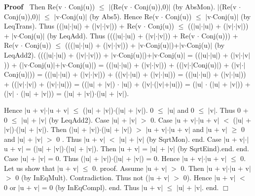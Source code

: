 \documentclass{article}
\newenvironment{forthel}{\begin{leftbar}}{\end{leftbar}}
\newenvironment{proof}{\noindent\textbf{Proof\ }}{\hspace*{\fill}$\Box$\medskip}
\newcommand{\cmul}{\cdot}
\newcommand{\cadd}{+}
\begin{document}
\begin{forthel}
\begin{proof}
Then Re(v $\cmul$ Conj(u)) $\leq$ $|$(Re(v $\cmul$ Conj(u)),0)$|$ (by AbsMon). $|$(Re(v $\cmul$ Conj(u)),0)$|$ $\leq$ $|$v$\cmul$Conj(u)$|$ (by Abs5).
Hence Re(v $\cmul$ Conj(u)) $\leq$ $|$v$\cmul$Conj(u)$|$ (by LeqTrans).
Thus (($|$u$|$$\cdot$$|$u$|$) + ($|$v$|$$\cdot$$|$v$|$)) + Re(v $\cmul$ Conj(u)) $\leq$ (($|$u$|$$\cdot$$|$u$|$) + ($|$v$|$$\cdot$$|$v$|$)) + $|$v$\cmul$Conj(u)$|$ (by LeqAdd).
Thus ((($|$u$|$$\cdot$$|$u$|$) + ($|$v$|$$\cdot$$|$v$|$)) + Re(v $\cmul$ Conj(u))) + Re(v $\cmul$ Conj(u)) $\leq$ ((($|$u$|$$\cdot$$|$u$|$) + ($|$v$|$$\cdot$$|$v$|$)) + $|$v$\cmul$Conj(u)$|$)+$|$v$\cmul$Conj(u)$|$ (by LeqAdd2).
((($|$u$|$$\cdot$$|$u$|$) + ($|$v$|$$\cdot$$|$v$|$)) + $|$v$\cmul$Conj(u)$|$)+$|$v$\cmul$Conj(u)$|$
= (($|$u$|$$\cdot$$|$u$|$) + ($|$v$|$$\cdot$$|$v$|$)) + ($|$v$\cmul$Conj(u)$|$+$|$v$\cmul$Conj(u)$|$) 
= (($|$u$|$$\cdot$$|$u$|$) + ($|$v$|$$\cdot$$|$v$|$)) + (($|$v$|$$\cdot$$|$Conj(u)$|$) + ($|$v$|$$\cdot$$|$Conj(u)$|$))
= (($|$u$|$$\cdot$$|$u$|$) + ($|$v$|$$\cdot$$|$v$|$)) + (($|$v$|$$\cdot$$|$u$|$) + ($|$v$|$$\cdot$$|$u$|$))
= (($|$u$|$$\cdot$$|$u$|$) + ($|$v$|$$\cdot$$|$u$|$)) + (($|$v$|$$\cdot$$|$v$|$) + ($|$v$|$$\cdot$$|$u$|$))
= (($|$u$|$ + $|$v$|$) $\cdot$ $|$u$|$) + ($|$v$|$$\cdot$($|$v$|$+$|$u$|$))
= ($|$u$|$ $\cdot$ ($|$u$|$ + $|$v$|$)) + ($|$v$|$ $\cdot$ ($|$u$|$ + $|$v$|$))
= ($|$u$|$ + $|$v$|$)$\cdot$($|$u$|$ + $|$v$|$).

Hence $|$u $\cadd$ v$|$$\cdot$$|$u $\cadd$ v$|$ $\leq$ ($|$u$|$ + $|$v$|$)$\cdot$($|$u$|$ + $|$v$|$).
0 $\leq$ $|$u$|$ and 0 $\leq$ $|$v$|$. Thus 0 + 0 $\leq$ $|$u$|$ + $|$v$|$ (by LeqAdd2).
Case $|$u$|$ + $|$v$|$ $>$ 0. 
Case $|$u $\cadd$ v$|$$\cdot$$|$u $\cadd$ v$|$ $<$ ($|$u$|$ + $|$v$|$)$\cdot$($|$u$|$ + $|$v$|$). 
Then ($|$u$|$ + $|$v$|$)$\cdot$($|$u$|$ + $|$v$|$) $>$ $|$u $\cadd$ v$|$$\cdot$$|$u $\cadd$ v$|$ and $|$u $\cadd$ v$|$ $\geq$ 0 and $|$u$|$ + $|$v$|$ $>$ 0 .
Thus $|$u $\cadd$ v$|$ $<$ $|$u$|$ + $|$v$|$ (by SqrtMon). end.
Case $|$u $\cadd$ v$|$$\cdot$$|$u $\cadd$ v$|$ = ($|$u$|$ + $|$v$|$)$\cdot$($|$u$|$ + $|$v$|$). Then $|$u $\cadd$ v$|$ = $|$u$|$ + $|$v$|$ (by SqrtEind).end.
end.
Case $|$u$|$ + $|$v$|$ = 0. Thus ($|$u$|$ + $|$v$|$)$\cdot$($|$u$|$ + $|$v$|$) = 0. Hence $|$u $\cadd$ v$|$$\cdot$$|$u $\cadd$ v$|$ $\leq$ 0. 
Let us show that $|$u $\cadd$ v$|$ $\leq$ 0. 
proof. 	Assume $|$u $\cadd$ v$|$ $>$ 0. Then $|$u $\cadd$ v$|$$\cdot$$|$u $\cadd$ v$|$ $>$ 0 (by InEqMult). Contradiction.
Thus not ($|$u $\cadd$ v$|$ $>$ 0). Hence $|$u $\cadd$ v$|$ $<$ 0 or $|$u $\cadd$ v$|$ = 0 (by InEqCompl).
end.
Thus $|$u $\cadd$ v$|$ $\leq$ $|$u$|$ + $|$v$|$.
end.
\end{proof}

\end{forthel}
\end{document}

